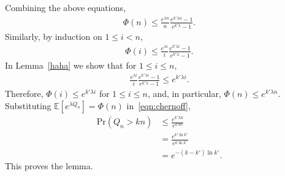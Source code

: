 \documentclass[twoside,11pt]{article}
\newcommand{\EE}{\mathbb{E}}
\newcommand{\pr}{\text{Pr}}
\begin{document}
Combining the above equations,
\begin{align*}
 \Phi(n)\le \frac{e^{\lambda n}}{n} \frac{e^{k'\lambda n}-1}{e^{k'\lambda}-1}.
\end{align*}
Similarly, by induction on $1\le i<n$,
\begin{align*}
 \Phi(i)\le \frac{e^{\lambda i}}{i} \frac{e^{k'\lambda i}-1}{e^{k'\lambda}-1}.
\end{align*}
In Lemma~\ref{haha} we show that for $1 \le i\le n$,
\begin{align}
\label{eqn:ke}
 \frac{e^{\lambda i}}{i} \frac{e^{k'\lambda i}-1}{e^{k'\lambda}-1} \le e^{k'\lambda i}.
\end{align}
Therefore, $\Phi(i)\le e^{k'\lambda i}$ for $1\le i\le n$, and, in
particular, $\Phi(n)\le e^{k'\lambda n}$. Substituting $\EE[e^{\lambda
    Q_n}]=\Phi(n)$ in~\eqref{eqn:chernoff},
\begin{align*}
 \pr(Q_n>kn) &\le \frac{e^{k'\lambda n}}{e^{k\lambda n}}\\
 &=\frac{e^{k'\ln k'}}{e^{k\ln k'}}\\
 &=e^{-(k-k')\ln k'}.
\end{align*}
\noindent This proves the lemma.
\end{document}
